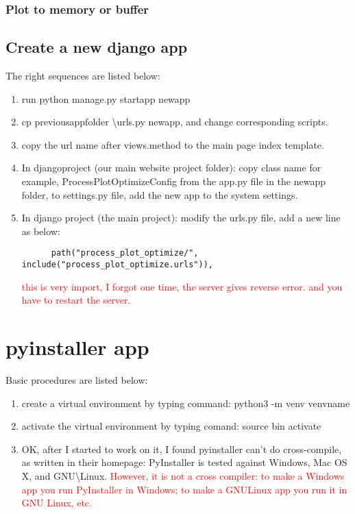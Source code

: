 \documentclass[UTF8,fancyhdr,a4paper]{ctexart}
\newcommand{\pflred}[1]{\textcolor{red}{#1}}
\begin{document}
\subsubsection{Plot to memory or buffer}

\subsection{Create a new django app}
The right sequences are listed below:
\begin{enumerate}
      \item run python manage.py startapp newapp
      \item cp previous\textunderscore app\textunderscore folder \textbackslash urls.py newapp, and change corresponding scripts.
      \item copy the url name after views.method to the main page index template.
      \item In django\textunderscore project (our main website project folder): copy class name for example, ProcessPlotOptimizeConfig from the app.py file in the newapp folder, to settings.py file, add the new app to the system settings.
      \item In django \textunderscore project (the main project): modify the urls.py file, add a new line as below: \begin{verbatim}
      path("process_plot_optimize/", include("process_plot_optimize.urls")),
      \end{verbatim} \pflred{this is very import, I forgot one time, the server gives reverse error. and you have to restart the server.}
\end{enumerate}


\section{pyinstaller app}
Basic procedures are listed below:
\begin{enumerate}
      \item create a virtual environment by typing command: python3 -m venv venv\textunderscore name
      \item activate the virtual environment by typing comand: source bin activate
      \item OK, after I started to work on it, I found pyinstaller can't do cross-compile, as written in their homepage: PyInstaller is tested against Windows, Mac OS X, and GNU\textbackslash Linux. \pflred{However, it is not a cross compiler: to make a Windows app you run PyInstaller in Windows; to make a GNULinux app you run it in GNU Linux, etc. }
\end{enumerate}
\end{document}
